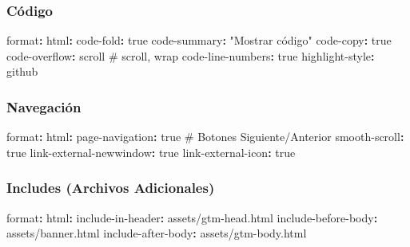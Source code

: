 \documentclass[
  doc,
  floatsintext,
  longtable,
  a4paper,
  nolmodern,
  notxfonts,
  notimes,
  12pt,
  colorlinks=true,linkcolor=blue,citecolor=blue,urlcolor=blue]{apa7}
\newenvironment{Shaded}{\begin{snugshade}}{\end{snugshade}}
\newcommand{\AttributeTok}[1]{\textcolor[rgb]{0.40,0.45,0.13}{#1}}
\newcommand{\CharTok}[1]{\textcolor[rgb]{0.13,0.47,0.30}{#1}}
\newcommand{\CommentTok}[1]{\textcolor[rgb]{0.37,0.37,0.37}{#1}}
\newcommand{\FunctionTok}[1]{\textcolor[rgb]{0.28,0.35,0.67}{#1}}
\newcommand{\KeywordTok}[1]{\textcolor[rgb]{0.00,0.23,0.31}{\textbf{#1}}}
\newcommand{\StringTok}[1]{\textcolor[rgb]{0.13,0.47,0.30}{#1}}
\begin{document}
\subsubsection{Código}\label{cuxf3digo}

\begin{Shaded}
\begin{Highlighting}[]
\FunctionTok{format}\KeywordTok{:}
\AttributeTok{  }\FunctionTok{html}\KeywordTok{:}
\AttributeTok{    }\FunctionTok{code{-}fold}\KeywordTok{:}\AttributeTok{ }\CharTok{true}
\AttributeTok{    }\FunctionTok{code{-}summary}\KeywordTok{:}\AttributeTok{ }\StringTok{"Mostrar código"}
\AttributeTok{    }\FunctionTok{code{-}copy}\KeywordTok{:}\AttributeTok{ }\CharTok{true}
\AttributeTok{    }\FunctionTok{code{-}overflow}\KeywordTok{:}\AttributeTok{ scroll}\CommentTok{            \# scroll, wrap}
\AttributeTok{    }\FunctionTok{code{-}line{-}numbers}\KeywordTok{:}\AttributeTok{ }\CharTok{true}
\AttributeTok{    }\FunctionTok{highlight{-}style}\KeywordTok{:}\AttributeTok{ github}
\end{Highlighting}
\end{Shaded}

\subsubsection{Navegación}\label{navegaciuxf3n}

\begin{Shaded}
\begin{Highlighting}[]
\FunctionTok{format}\KeywordTok{:}
\AttributeTok{  }\FunctionTok{html}\KeywordTok{:}
\AttributeTok{    }\FunctionTok{page{-}navigation}\KeywordTok{:}\AttributeTok{ }\CharTok{true}\CommentTok{            \# Botones Siguiente/Anterior}
\AttributeTok{    }\FunctionTok{smooth{-}scroll}\KeywordTok{:}\AttributeTok{ }\CharTok{true}
\AttributeTok{    }\FunctionTok{link{-}external{-}newwindow}\KeywordTok{:}\AttributeTok{ }\CharTok{true}
\AttributeTok{    }\FunctionTok{link{-}external{-}icon}\KeywordTok{:}\AttributeTok{ }\CharTok{true}
\end{Highlighting}
\end{Shaded}

\subsubsection{Includes (Archivos
Adicionales)}\label{includes-archivos-adicionales}

\begin{Shaded}
\begin{Highlighting}[]
\FunctionTok{format}\KeywordTok{:}
\AttributeTok{  }\FunctionTok{html}\KeywordTok{:}
\AttributeTok{    }\FunctionTok{include{-}in{-}header}\KeywordTok{:}\AttributeTok{ assets/gtm{-}head.html}
\AttributeTok{    }\FunctionTok{include{-}before{-}body}\KeywordTok{:}\AttributeTok{ assets/banner.html}
\AttributeTok{    }\FunctionTok{include{-}after{-}body}\KeywordTok{:}\AttributeTok{ assets/gtm{-}body.html}
\end{Highlighting}
\end{Shaded}
\end{document}
